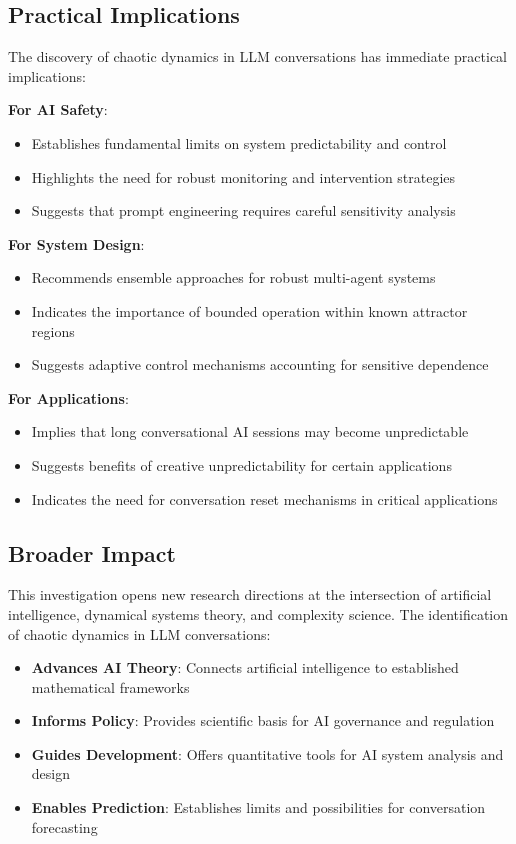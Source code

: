 \documentclass[11pt,a4paper]{article}
\begin{document}
\subsection{Practical Implications}

The discovery of chaotic dynamics in LLM conversations has immediate practical implications:

\textbf{For AI Safety}:
\begin{itemize}
    \item Establishes fundamental limits on system predictability and control
    \item Highlights the need for robust monitoring and intervention strategies
    \item Suggests that prompt engineering requires careful sensitivity analysis
\end{itemize}

\textbf{For System Design}:
\begin{itemize}
    \item Recommends ensemble approaches for robust multi-agent systems
    \item Indicates the importance of bounded operation within known attractor regions
    \item Suggests adaptive control mechanisms accounting for sensitive dependence
\end{itemize}

\textbf{For Applications}:
\begin{itemize}
    \item Implies that long conversational AI sessions may become unpredictable
    \item Suggests benefits of creative unpredictability for certain applications
    \item Indicates the need for conversation reset mechanisms in critical applications
\end{itemize}

\subsection{Broader Impact}

This investigation opens new research directions at the intersection of artificial intelligence, dynamical systems theory, and complexity science. The identification of chaotic dynamics in LLM conversations:

\begin{itemize}
    \item \textbf{Advances AI Theory}: Connects artificial intelligence to established mathematical frameworks
    \item \textbf{Informs Policy}: Provides scientific basis for AI governance and regulation
    \item \textbf{Guides Development}: Offers quantitative tools for AI system analysis and design
    \item \textbf{Enables Prediction}: Establishes limits and possibilities for conversation forecasting
\end{itemize}
\end{document}
